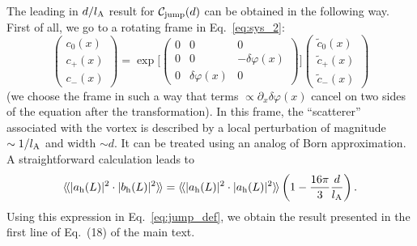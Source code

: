 \documentclass[pra,aps,a4paper,twocolumn,superscriptaddress,longbibliography]{revtex4-2}
\newcommand{\rngl}{\rangle\hspace{-0.05cm}\rangle}
\newcommand{\lngl}{\langle\hspace{-0.05cm}\langle}
\newcommand{\lprox}{L}
\newcommand{\lA}{l_{\rm A}}
\begin{document}
The leading in $d / \lA$ result for ${\cal C}_{\rm jump}(d)$ can be obtained in the following way. First of all, we go to a rotating frame in Eq.~\eqref{eq:sys_2}:
\begin{equation}
    \left(\begin{array}{c}
c_0(x)\\
c_+(x)\\
c_-(x)
\end{array}\right) = \exp\Big[ \begin{pmatrix}
0 & 0 & 0\\
0 & 0 & -\delta\varphi(x)\\
0 & \delta \varphi(x) & 0
\end{pmatrix}\Big]\left(\begin{array}{c}
\tilde{c}_0(x)\\
\tilde{c}_+(x)\\
\tilde{c}_-(x)
\end{array}\right)
\end{equation}
(we choose the frame in such a way that terms $\propto \partial_{x}\delta \varphi(x)$ cancel on two sides of the equation after the transformation).
In this frame, the ``scatterer'' associated with the vortex is described by a local perturbation of magnitude $\sim 1 / \lA$ and width $\sim d$. It can be treated using an analog of Born approximation. A straightforward calculation leads to
\begin{equation}
\lngl |a_{\rm h}(\lprox)|^2 \cdot |b_{\rm h}(\lprox)|^2\rngl = \lngl |a_{\rm h}(\lprox)|^2 \cdot |a_{\rm h}(\lprox)|^2\rngl \left(1 - \frac{16\pi}{3}\frac{d}{\lA}\right).
\end{equation}
Using this expression in Eq.~\eqref{eq:jump_def}, we obtain the result presented in the first line of Eq.~(18) of the main text.
\end{document}

